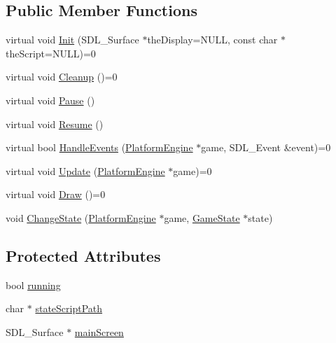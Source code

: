 \subsection*{Public Member Functions}
\begin{CompactItemize}
\item 
virtual void \hyperlink{class_platform_1_1_game_state_37209d2617d04c6387a961cb2c8f3663}{Init} (SDL\_\-Surface $\ast$theDisplay=NULL, const char $\ast$theScript=NULL)=0
\item 
virtual void \hyperlink{class_platform_1_1_game_state_e85d9b80e26a0a4708423e370d0a4b8a}{Cleanup} ()=0
\item 
virtual void \hyperlink{class_platform_1_1_game_state_aa49568d0da70ded81719cfa83052028}{Pause} ()
\item 
virtual void \hyperlink{class_platform_1_1_game_state_d2a5e5f3ba807bbf9445baba9f36fea7}{Resume} ()
\item 
virtual bool \hyperlink{class_platform_1_1_game_state_9edb3c6ed58b5a6c0b40cb07b01e5f31}{HandleEvents} (\hyperlink{class_platform_1_1_platform_engine}{PlatformEngine} $\ast$game, SDL\_\-Event \&event)=0
\item 
virtual void \hyperlink{class_platform_1_1_game_state_d39851d7ffd329b2005f1d2c72cf65a2}{Update} (\hyperlink{class_platform_1_1_platform_engine}{PlatformEngine} $\ast$game)=0
\item 
virtual void \hyperlink{class_platform_1_1_game_state_a864d8c7f6094afd421a516729e3dd95}{Draw} ()=0
\item 
void \hyperlink{class_platform_1_1_game_state_602091629b4bca2073f12bfa6c61e6d0}{ChangeState} (\hyperlink{class_platform_1_1_platform_engine}{PlatformEngine} $\ast$game, \hyperlink{class_platform_1_1_game_state}{GameState} $\ast$state)
\end{CompactItemize}
\subsection*{Protected Attributes}
\begin{CompactItemize}
\item 
bool \hyperlink{class_platform_1_1_game_state_2e64c5095158f8a2d03d180d701af768}{running}
\item 
char $\ast$ \hyperlink{class_platform_1_1_game_state_791f4e1dc5c097e707cdca3499fe7ff1}{stateScriptPath}
\item 
SDL\_\-Surface $\ast$ \hyperlink{class_platform_1_1_game_state_12616fd9e6b9620fb0c8228a35aec98a}{mainScreen}
\end{CompactItemize}


